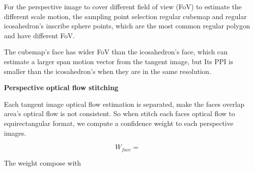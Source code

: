 For the perspective image to cover different field of view (FoV)  to estimate the different scale motion, the sampling point selection regular cubemap and regular icosahedron's inscribe sphere points, which are the most common regular polygon and have different FoV. ~\cite{xxx}

The cubemap's face has wider FoV than the icosahedron's face, which can estimate a larger span motion vector from the tangent image, but Its PPI is smaller than the icosahedron's when they are in the same resolution.


\textbf{Perspective optical flow stitching}

Each tangent image optical flow estimation is separated, make the faces overlap area's optical flow is not consistent.
So when stitch each faces optical flow to equirectangular format, we compute a confidence weight to each perspective images. 

\begin{equation}
W_{face} =
\end{equation}


The weight compose with 


